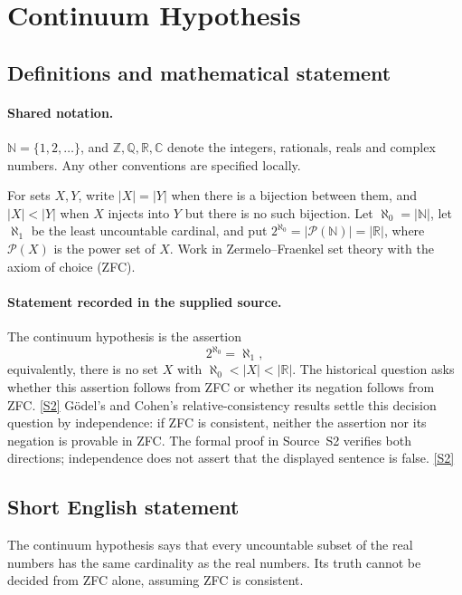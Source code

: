 \documentclass[11pt]{article}
\newcommand{\sref}[2]{\hyperlink{source:#1:#2}{[S#2]}}
\begin{document}
\section{Continuum Hypothesis}\label{statement}

\subsection{Definitions and mathematical statement}

\paragraph{Shared notation.}$\mathbb N=\{1,2,\ldots\}$, and $\mathbb Z,\mathbb Q,\mathbb R,\mathbb C$ denote the integers, rationals, reals and complex numbers. Any other conventions are specified locally.


For sets $X,Y$, write $|X|=|Y|$ when there is a bijection between them, and $|X|<|Y|$ when $X$ injects into $Y$ but there is no such bijection. Let $\aleph_0=|\mathbb N|$, let $\aleph_1$ be the least uncountable cardinal, and put $2^{\aleph_0}=|\mathcal P(\mathbb N)|=|\mathbb R|$, where $\mathcal P(X)$ is the power set of $X$. Work in Zermelo--Fraenkel set theory with the axiom of choice (ZFC).
\paragraph{Statement recorded in the supplied source.}
The continuum hypothesis is the assertion
\[
 2^{\aleph_0}=\aleph_1,
\]
equivalently, there is no set $X$ with $\aleph_0<|X|<|\mathbb R|$. The historical question asks whether this assertion follows from ZFC or whether its negation follows from ZFC. \sref{statement}{2}
Gödel's and Cohen's relative-consistency results settle this decision question by independence: if ZFC is consistent, neither the assertion nor its negation is provable in ZFC. The formal proof in Source~S2 verifies both directions; independence does not assert that the displayed sentence is false. \sref{statement}{2}
\subsection{Short English statement}
The continuum hypothesis says that every uncountable subset of the real numbers has the same cardinality as the real numbers. Its truth cannot be decided from ZFC alone, assuming ZFC is consistent.
\end{document}
